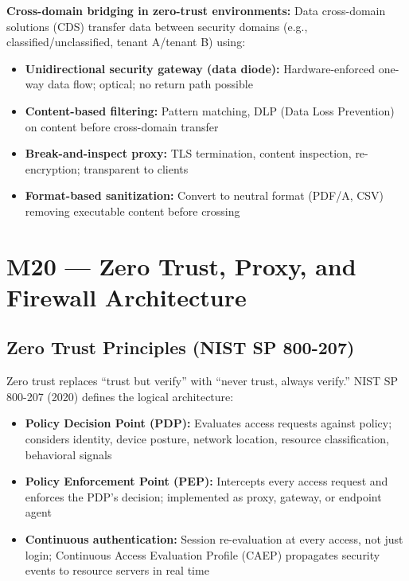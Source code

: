 \documentclass[11pt,letterpaper]{article}
\begin{document}
\textbf{Cross-domain bridging in zero-trust environments:}
Data cross-domain solutions (CDS) transfer data between security domains (e.g., classified/unclassified, tenant A/tenant B) using:
\begin{itemize}[noitemsep]
  \item \textbf{Unidirectional security gateway (data diode):} Hardware-enforced one-way data flow; optical; no return path possible
  \item \textbf{Content-based filtering:} Pattern matching, DLP (Data Loss Prevention) on content before cross-domain transfer
  \item \textbf{Break-and-inspect proxy:} TLS termination, content inspection, re-encryption; transparent to clients
  \item \textbf{Format-based sanitization:} Convert to neutral format (PDF/A, CSV) removing executable content before crossing
\end{itemize}

\newpage

\section{M20 — Zero Trust, Proxy, and Firewall Architecture}

\subsection{Zero Trust Principles (NIST SP 800-207)}

Zero trust replaces ``trust but verify'' with ``never trust, always verify.'' NIST SP 800-207 (2020) defines the logical architecture:

\begin{itemize}[noitemsep]
  \item \textbf{Policy Decision Point (PDP):} Evaluates access requests against policy; considers identity, device posture, network location, resource classification, behavioral signals
  \item \textbf{Policy Enforcement Point (PEP):} Intercepts every access request and enforces the PDP's decision; implemented as proxy, gateway, or endpoint agent
  \item \textbf{Continuous authentication:} Session re-evaluation at every access, not just login; Continuous Access Evaluation Profile (CAEP) propagates security events to resource servers in real time
\end{itemize}
\end{document}
